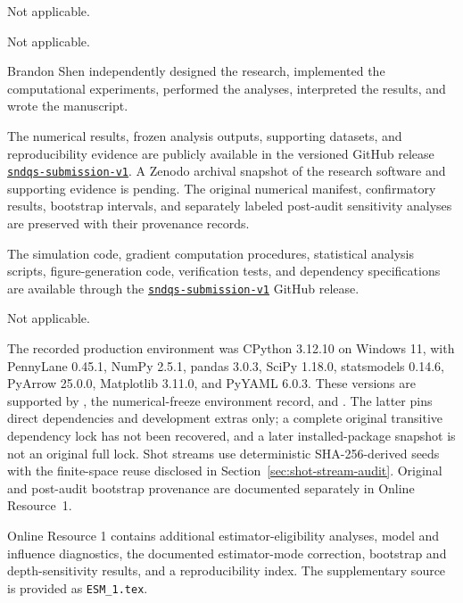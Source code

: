 \documentclass[pdflatex,sn-mathphys-num,Numbered]{sn-jnl}
\begin{document}
 Not applicable.

 Not applicable.

 Brandon Shen independently designed the research, implemented the computational experiments, performed the analyses, interpreted the results, and wrote the manuscript.

The numerical results, frozen analysis outputs, supporting datasets, and reproducibility evidence are publicly available in the versioned GitHub release \href{https://github.com/Brandon-Shen/few-qubit-qnn-snr/releases/tag/sndqs-submission-v1}{\texttt{sndqs-submission-v1}}. A Zenodo archival snapshot of the research software and supporting evidence is pending. The original numerical manifest, confirmatory results, bootstrap intervals, and separately labeled post-audit sensitivity analyses are preserved with their provenance records.

The simulation code, gradient computation procedures, statistical analysis scripts, figure-generation code, verification tests, and dependency specifications are available through the \href{https://github.com/Brandon-Shen/few-qubit-qnn-snr/releases/tag/sndqs-submission-v1}{\texttt{sndqs-submission-v1}} GitHub release.

 Not applicable.

 The recorded production environment was CPython 3.12.10 on Windows 11, with PennyLane 0.45.1, NumPy 2.5.1, pandas 3.0.3, SciPy 1.18.0, statsmodels 0.14.6, PyArrow 25.0.0, Matplotlib 3.11.0, and PyYAML 6.0.3. These versions are supported by , the numerical-freeze environment record, and . The latter pins direct dependencies and development extras only; a complete original transitive dependency lock has not been recovered, and a later installed-package snapshot is not an original full lock. Shot streams use deterministic SHA-256-derived seeds with the finite-space reuse disclosed in Section~\ref{sec:shot-stream-audit}. Original and post-audit bootstrap provenance are documented separately in Online Resource~1.

 Online Resource 1 contains additional estimator-eligibility analyses, model and influence diagnostics, the documented estimator-mode correction, bootstrap and depth-sensitivity results, and a reproducibility index. The supplementary source is provided as \texttt{ESM\_1.tex}.


\end{document}
